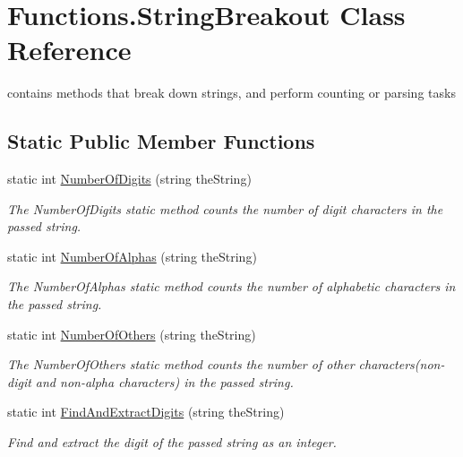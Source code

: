 \hypertarget{class_functions_1_1_string_breakout}{\section{Functions.\+String\+Breakout Class Reference}
\label{class_functions_1_1_string_breakout}
}


contains methods that break down strings, and perform counting or parsing tasks  


\subsection*{Static Public Member Functions}
\begin{DoxyCompactItemize}
\item 
static int \hyperlink{class_functions_1_1_string_breakout_aa7d5d77950a7d09eee4b744814fef65f}{Number\+Of\+Digits} (string the\+String)
\begin{DoxyCompactList}\small\item\em The Number\+Of\+Digits static method counts the number of digit characters in the passed string. \end{DoxyCompactList}\item 
static int \hyperlink{class_functions_1_1_string_breakout_ae72248e822973a8237bf40ecd00de814}{Number\+Of\+Alphas} (string the\+String)
\begin{DoxyCompactList}\small\item\em The Number\+Of\+Alphas static method counts the number of alphabetic characters in the passed string. \end{DoxyCompactList}\item 
static int \hyperlink{class_functions_1_1_string_breakout_a172b9f1468b17d16d0d926a4ff6778d1}{Number\+Of\+Others} (string the\+String)
\begin{DoxyCompactList}\small\item\em The Number\+Of\+Others static method counts the number of other characters(non-\/digit and non-\/alpha characters) in the passed string. \end{DoxyCompactList}\item 
static int \hyperlink{class_functions_1_1_string_breakout_a7589f32f12907847d1c1ac1d4cb0ca57}{Find\+And\+Extract\+Digits} (string the\+String)
\begin{DoxyCompactList}\small\item\em Find and extract the digit of the passed string as an integer. \end{DoxyCompactList}\end{DoxyCompactItemize}



